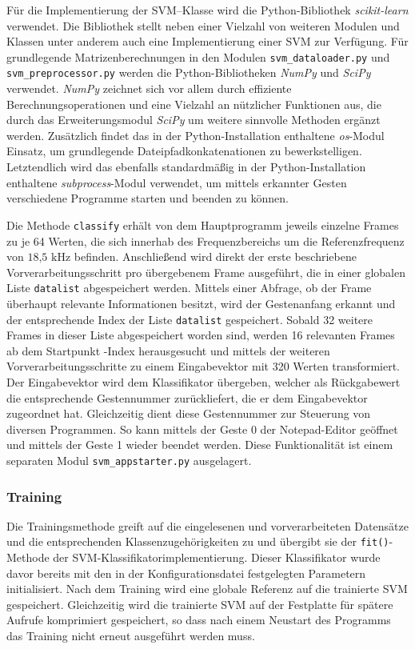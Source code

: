 Für die Implementierung der \ac{SVM}--Klasse wird die Python-Bibliothek \textit{scikit-learn} verwendet. 
Die Bibliothek stellt neben einer Vielzahl von weiteren Modulen und Klassen unter anderem auch eine Implementierung einer \ac{SVM} zur Verfügung.
Für grundlegende Matrizenberechnungen in den Modulen \texttt{svm\_dataloader.py} und \texttt{svm\_preprocessor.py} werden die Python-Bibliotheken \textit{NumPy} und \textit{SciPy} verwendet. 
\textit{NumPy} zeichnet sich vor allem durch effiziente Berechnungsoperationen und eine Vielzahl an nützlicher Funktionen aus, die durch das Erweiterungsmodul \textit{SciPy} um weitere sinnvolle Methoden ergänzt werden.
Zusätzlich findet das in der Python-Installation enthaltene \textit{os}-Modul Einsatz, um grundlegende Dateipfadkonkatenationen zu bewerkstelligen.
Letztendlich wird das ebenfalls standardmäßig in der Python-Installation enthaltene \textit{subprocess}-Modul verwendet, um mittels erkannter Gesten verschiedene Programme starten und beenden zu können.


Die Methode \texttt{classify} erhält von dem Hauptprogramm jeweils einzelne Frames zu je 64 Werten, die sich innerhab des Frequenzbereichs um die Referenzfrequenz von $18\text{,}5\text{ kHz}$ befinden.
Anschließend wird direkt der erste beschriebene Vorverarbeitungsschritt pro übergebenem Frame ausgeführt, die in einer globalen Liste \texttt{datalist} abgespeichert werden.
Mittels einer Abfrage, ob der Frame überhaupt relevante Informationen besitzt, wird der Gestenanfang erkannt und der entsprechende Index der Liste \texttt{datalist} gespeichert.
Sobald 32 weitere Frames in dieser Liste abgespeichert worden sind, werden 16 relevanten Frames ab dem Startpunkt -Index herausgesucht und mittels der weiteren Vorverarbeitungsschritte zu einem Eingabevektor mit 320 Werten transformiert.
Der Eingabevektor wird dem Klassifikator übergeben, welcher als Rückgabewert die entsprechende Gestennummer zurückliefert, die er dem Eingabevektor zugeordnet hat.
Gleichzeitig dient diese Gestennummer zur Steuerung von diversen Programmen.
So kann mittels der Geste 0 der Notepad-Editor geöffnet und mittels der Geste 1 wieder beendet werden.
Diese Funktionalität ist einem separaten Modul \texttt{svm\_appstarter.py} ausgelagert.




\subsubsection{Training}
Die Trainingsmethode greift auf die eingelesenen und vorverarbeiteten Datensätze und die entsprechenden Klassenzugehörigkeiten zu und übergibt sie der \texttt{fit()}-Methode der \ac{SVM}-Klassifikatorimplementierung.
Dieser Klassifikator wurde davor bereits mit den in der Konfigurationsdatei festgelegten Parametern initialisiert.
Nach dem Training wird eine globale Referenz auf die trainierte \ac{SVM} gespeichert.
Gleichzeitig wird die trainierte \ac{SVM} auf der Festplatte für spätere Aufrufe komprimiert gespeichert, so dass nach einem Neustart des Programms das Training nicht erneut ausgeführt werden muss.



